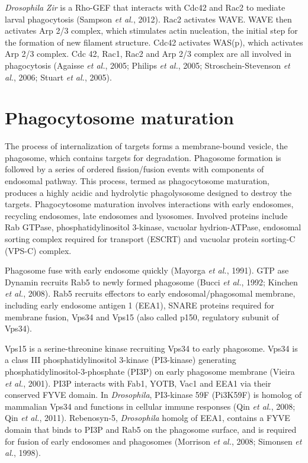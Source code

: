 \documentclass[11pt]{article}
\begin{document}
\newline

\textit{Drosophila} \textit{Zir} is a Rho-GEF that interacts with Cdc42 and Rac2 to mediate larval phagocytosis (Sampson \textit{et al.}, 2012). 
Rac2 activates WAVE. 
WAVE then activates Arp 2/3 complex, which stimulates actin nucleation, the initial step for the formation of new filament structure. 
Cdc42 activates WAS(p), which activates Arp 2/3 complex. 
Cdc 42, Rac1, Rac2 and Arp 2/3 complex are all involved in phagocytosis (Agaisse \textit{et al.}, 2005; Philips \textit{et al.}, 2005; Stroschein-Stevenson \textit{et al.}, 2006; Stuart \textit{et al.}, 2005).

\section{Phagocytosome maturation}
The process of internalization of targets forms a membrane-bound vesicle, the phagosome, which contains targets for degradation. 
Phagosome formation is followed by a series of ordered fission/fusion events with components of endosomal pathway. 
This process, termed as phagocytosome maturation, produces a highly acidic and hydrolytic phagolysosome designed to destroy the targets. 
Phagocytosome maturation involves interactions with early endosomes, recycling endosomes, late endosomes and lysosomes. 
Involved proteins include Rab GTPase, phosphatidylinositol 3-kinase, vacuolar hydrion-ATPase, endosomal sorting complex required for transport (ESCRT) and vacuolar protein sorting-C (VPS-C) complex. 

\newline

Phagosome fuse with early endosome quickly (Mayorga \textit{et al.}, 1991). 
GTP ase Dynamin recruits Rab5 to newly formed phagosome (Bucci \textit{et al.}, 1992; Kinchen \textit{et al.}, 2008). 
Rab5 recruits effectors to early endosomal/phagosomal membrane, including early endosome antigen 1 (EEA1), SNARE proteins required for membrane fusion, Vps34 and Vps15 (also called p150, regulatory subunit of Vps34). 

\newline

Vps15 is a serine-threonine kinase recruiting Vps34 to early phagosome. 
Vps34 is a class III phosphatidylinositol 3-kinase (PI3-kinase) generating phosphatidylinositol-3-phosphate (PI3P) on early phagosome membrane (Vieira \textit{et al.}, 2001). 
PI3P interacts with Fab1, YOTB, Vac1 and EEA1 via their conserved FYVE domain. 
In \textit{Drosophila}, PI3-kinase 59F (Pi3K59F) is homolog of mammalian Vps34 and functions in cellular immune responses (Qin \textit{et al.}, 2008; Qin \textit{et al.}, 2011). 
Rebenosyn-5, \textit{Drosophila} homolg of EEA1, contains a FYVE domain that binds to PI3P and Rab5 on the phagosome surface, and is required for fusion of early endosomes and phagosomes (Morrison \textit{et al.}, 2008; Simonsen \textit{et al.}, 1998). 
\end{document}
